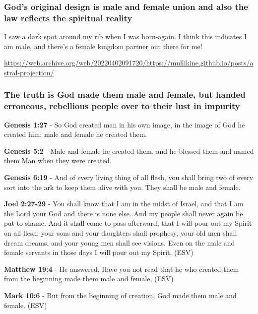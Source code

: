 \documentclass[11pt]{article}
\begin{document}
\subsubsection{God's original design is male and female union and also the law reflects the spiritual reality}
\label{sec:org0520cd1}

I saw a dark spot around my rib when I was born-again.
I think this indicates I am male, and there's a female kingdom partner out there for me!

\url{https://web.archive.org/web/20220402091720/https://mullikine.github.io/posts/astral-projection/}

\subsubsection{The truth is God made them male and female, but handed erroneous, rebellious people over to their lust in impurity}
\label{sec:org75d95e7}
\textbf{Genesis 1:27} - So God created man in his own image, in the image of God he created him; male and female he created them.

\textbf{Genesis 5:2} - Male and female he created them, and he blessed them and named them Man when they were created.

\textbf{Genesis 6:19} - And of every living thing of all flesh, you shall bring two of every sort into the ark to keep them alive with you. They shall be male and female.

\textbf{Joel 2:27-29} - You shall know that I am in the midst of Israel, and that I am the Lord your God and there is none else. And my people shall never again be put to shame.  And it shall come to pass afterward, that I will pour out my Spirit on all flesh; your sons and your daughters shall prophesy, your old men shall dream dreams, and your young men shall see visions.  Even on the male and female servants in those days I will pour out my Spirit. (ESV)

\textbf{Matthew 19:4} - He answered, Have you not read that he who created them from the beginning made them male and female, (ESV)

\textbf{Mark 10:6} - But from the beginning of creation, God made them male and female. (ESV)
\end{document}
